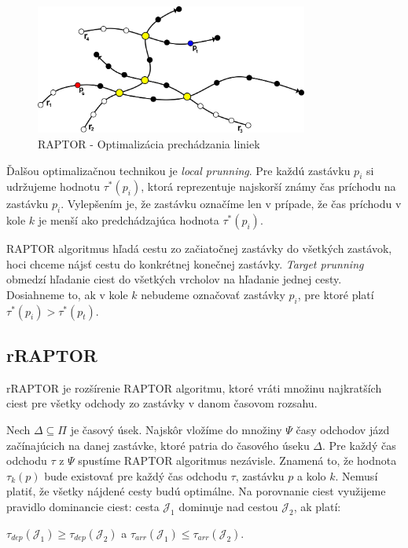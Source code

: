 \begin{figure}[H]
\centerline{\includegraphics[width=0.8\textwidth]{images/raptor-optimal}}
\caption[RAPTOR - Optimalizácia prechádzania liniek]{RAPTOR - Optimalizácia prechádzania liniek}
\label{fig:raptor-optimal}
\end{figure}

Ďalšou optimalizačnou technikou je \textit{local prunning}. Pre každú zastávku $p_i$ si udržujeme hodnotu $\tau^*(p_i)$, ktorá reprezentuje najskorší známy čas príchodu na zastávku $p_i$. Vylepšením je, že zastávku označíme len v prípade, že čas príchodu v kole $k$ je menší ako predchádzajúca hodnota $\tau^*(p_i)$. 

RAPTOR algoritmus hľadá cestu zo začiatočnej zastávky do všetkých zastávok, hoci chceme nájsť cestu do konkrétnej konečnej zastávky. \textit{Target prunning} obmedzí hľadanie ciest do všetkých vrcholov na hľadanie jednej cesty. Dosiahneme to, ak v kole $k$ nebudeme označovať zastávky $p_i$, pre ktoré platí $\tau^*(p_i) > \tau^*(p_t)$.   

\subsection{rRAPTOR}
\label{sub:rraptor}
rRAPTOR je rozšírenie RAPTOR algoritmu, ktoré vráti množinu najkratších ciest pre všetky odchody zo zastávky v danom časovom rozsahu. 

Nech $\Delta \subseteq \Pi$ je časový úsek. Najskôr vložíme do množiny $\Psi$ časy odchodov jázd začínajúcich na danej zastávke, ktoré patria do časového úseku $\Delta$. Pre každý čas odchodu $\tau$ z $\Psi$ spustíme RAPTOR algoritmus nezávisle. Znamená to, že hodnota $\tau_k(p)$ bude existovať pre každý čas odchodu $\tau$, zastávku $p$ a kolo $k$. Nemusí platiť, že všetky nájdené cesty budú optimálne. Na porovnanie ciest využijeme pravidlo dominancie ciest: cesta $\mathcal{J}_1$ dominuje nad cestou $\mathcal{J}_2$, ak platí:

$\tau_{dep}(\mathcal{J}_1) \geq \tau_{dep}(\mathcal{J}_2)$ a $\tau_{arr}(\mathcal{J}_1) \leq \tau_{arr}(\mathcal{J}_2)$. 


